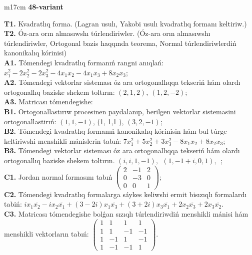 \documentclass{article}
\begin{document}
\begin{tabular}{m{17cm}}
\textbf{48-variant}
\newline

\textbf{T1.} Kvadratlıq forma. (Lagran usulı, Yakobi usulı kvadratlıq formanı keltiriw.) \\
\textbf{T2.} Óz-ara orın almasıwshı túrlendiriwler. (Óz-ara orın almasıwshı túrlendiriwler,  Ortogonal bazis haqqında teorema,  Normal túrlendiriwlerdiń kanonikalıq kórinisi) \\
\textbf{A1.} Tómendegi kvadratlıq formanıń rangni anıqlań: \(x_{1}^{2} - 2x_{2}^{2} - 2x_{3}^{2} - 4x_{1}x_{2} - 4x_{1}x_{3} + 8x_{2}x_{3}\); \\
\textbf{A2.} Tómendegi vektorlar sisteması óz ara ortogonallıqqa tekseriń hám olardı ortogonallıq baziske shekem toltırın: \((2,1,2),\ (1,2, - 2)\); \\
\textbf{A3.} Matricası tómendegishe: \\
\textbf{B1.} Ortogonallastırıw procesinen paydalanıp, berilgen vektorlar sistemasini ortogonallastirıń: \((1,1, - 1)\), (1, 1,1 ), \((3,2, - 1)\); \\
\textbf{B2.} Tómendegi kvadratlıq formanıń kanonikalıq kórinisin hám bul túrge keltiriwshi menshikli mánislerin tabıń: \(7x_{1}^{2} + 5x_{2}^{2} + 3x_{3}^{2} - 8x_{1}x_{2} + 8x_{2}x_{3}\); \\
\textbf{B3.} Tómendegi vektorlar sisteması óz ara ortogonallıqqa tekseriń hám olardı ortogonallıq baziske shekem toltırın. \((i,i,1, - 1),\ \ (1, - 1 + i,0,1),\ \ \); \\
\textbf{C1.} Jordan normal formasını tabıń \(\begin{pmatrix} 2 & - 1 & 2 \\ 0 & - 3 & 0 \\ 0 & 0 & 1 \end{pmatrix}\); \\
\textbf{C2.} Tómendegi kvadratlıq formalarga sáykes keliwshi ermit bisızıqlı formalardı tabiń: \(ix_{1}\overline{x_{2}} - ix_{2}\overline{x_{1}} + (3 - 2i)x_{1}\overline{x_{3}} + (3 + 2i)x_{3}\overline{x_{1}} + 2x_{2}\overline{x_{3}} + 2x_{3}\overline{x_{2}}\). \\
\textbf{C3.} Matricası tómendegishe bolǵan sızıqlı túrlendiriwdiń menshikli mánisi hám menshikli vektorların tabıń: \(\begin{pmatrix} 1 & 1 & 1 & 1 \\ 1 & 1 & - 1 & - 1 \\ 1 & - 1 & 1 & - 1 \\ 1 & - 1 & - 1 & 1 \end{pmatrix}\). \\

\end{tabular}
\vspace{1cm}
\end{document}
